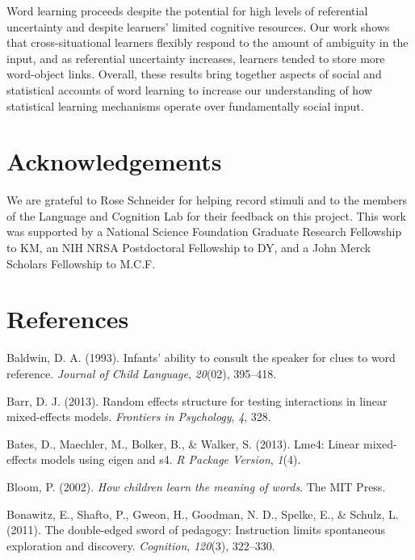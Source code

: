 \documentclass[authoryear, review]{elsarticle}
\begin{document}
Word learning proceeds despite the potential for high levels of
referential uncertainty and despite learners' limited cognitive
resources. Our work shows that cross-situational learners flexibly
respond to the amount of ambiguity in the input, and as referential
uncertainty increases, learners tended to store more word-object links.
Overall, these results bring together aspects of social and statistical
accounts of word learning to increase our understanding of how
statistical learning mechanisms operate over fundamentally social input.

\newpage

\section{Acknowledgements}\label{acknowledgements}

We are grateful to Rose Schneider for helping record stimuli and to the
members of the Language and Cognition Lab for their feedback on this
project. This work was supported by a National Science Foundation
Graduate Research Fellowship to KM, an NIH NRSA Postdoctoral Fellowship
to DY, and a John Merck Scholars Fellowship to M.C.F.

\newpage

\section{References}\label{references}

\setlength{\parindent}{-0.1in} \setlength{\leftskip}{0.125in} \noindent

\hypertarget{refs}{}
\hypertarget{ref-baldwin1993infants}{}
Baldwin, D. A. (1993). Infants' ability to consult the speaker for clues
to word reference. \emph{Journal of Child Language}, \emph{20}(02),
395--418.

\hypertarget{ref-barr2013random}{}
Barr, D. J. (2013). Random effects structure for testing interactions in
linear mixed-effects models. \emph{Frontiers in Psychology}, \emph{4},
328.

\hypertarget{ref-bates2013lme4}{}
Bates, D., Maechler, M., Bolker, B., \& Walker, S. (2013). Lme4: Linear
mixed-effects models using eigen and s4. \emph{R Package Version},
\emph{1}(4).

\hypertarget{ref-bloom2002children}{}
Bloom, P. (2002). \emph{How children learn the meaning of words}. The
MIT Press.

\hypertarget{ref-bonawitz2011double}{}
Bonawitz, E., Shafto, P., Gweon, H., Goodman, N. D., Spelke, E., \&
Schulz, L. (2011). The double-edged sword of pedagogy: Instruction
limits spontaneous exploration and discovery. \emph{Cognition},
\emph{120}(3), 322--330.
\end{document}
